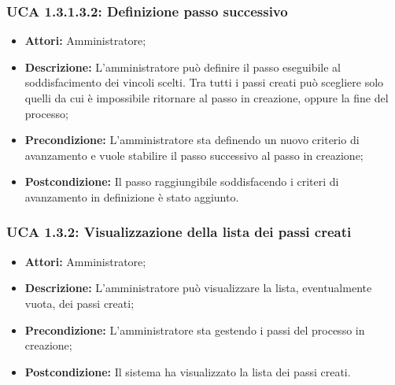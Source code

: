 \subsubsection{UCA 1.3.1.3.2: Definizione passo successivo}
\begin{itemize}
\item \textbf{Attori:}
 Amministratore;
\item \textbf{Descrizione:}
 L'amministratore può definire il passo eseguibile al soddisfacimento dei vincoli scelti. Tra tutti i passi creati può scegliere solo quelli da cui è impossibile ritornare al passo in creazione, oppure la fine del processo;
\item \textbf{Precondizione:} 
L'amministratore sta definendo un nuovo criterio di avanzamento e vuole stabilire il passo successivo al passo in creazione;
\item \textbf{Postcondizione:} 
Il passo raggiungibile soddisfacendo i criteri di avanzamento in definizione è stato aggiunto.
\end{itemize}

\hypertarget{A1.3.2}{}
\subsubsection{UCA 1.3.2: Visualizzazione della lista dei passi creati}
\begin{itemize}
\item \textbf{Attori:}
 Amministratore;
\item \textbf{Descrizione:}
 L'amministratore può visualizzare la lista, eventualmente vuota, dei passi creati;
\item \textbf{Precondizione:} 
L'amministratore sta gestendo i passi del processo in creazione;
\item \textbf{Postcondizione:} 
Il sistema ha visualizzato la lista dei passi creati.
\end{itemize}

\hypertarget{A1.3.3}{}
